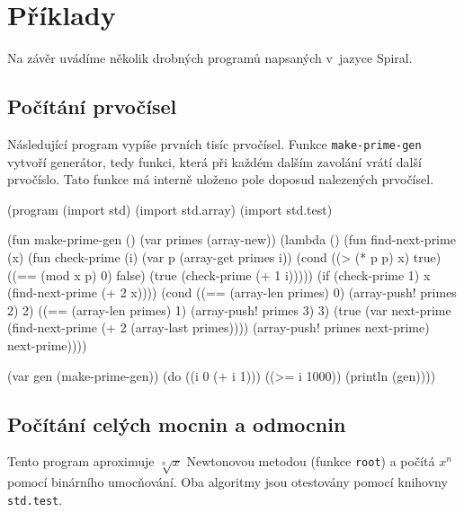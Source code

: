 \section{Příklady}

Na závěr uvádíme několik drobných programů napsaných v~jazyce Spiral.

\subsection{Počítání prvočísel}

Následující program vypíše prvních tisíc prvočísel. Funkce
\texttt{make-prime-gen} vytvoří generátor, tedy funkci, která při každém dalším
zavolání vrátí další prvočíslo. Tato funkce má interně uloženo pole doposud
nalezených prvočísel.

\begin{spiral}
(program
  (import std)
  (import std.array)
  (import std.test)

  (fun make-prime-gen ()
    (var primes (array-new))
    (lambda ()
      (fun find-next-prime (x)
        (fun check-prime (i)
          (var p (array-get primes i))
          (cond
            ((> (* p p) x) true)
            ((== (mod x p) 0) false)
            (true (check-prime (+ 1 i)))))
        (if (check-prime 1) x (find-next-prime (+ 2 x))))
      (cond
        ((== (array-len primes) 0)
          (array-push! primes 2) 2)
        ((== (array-len primes) 1)
          (array-push! primes 3) 3)
        (true 
          (var next-prime (find-next-prime (+ 2 (array-last primes))))
          (array-push! primes next-prime)
          next-prime))))

  (var gen (make-prime-gen))
  (do ((i 0 (+ i 1)))
    ((>= i 1000))
    (println (gen))))
\end{spiral}

\subsection{Počítání celých mocnin a odmocnin}

Tento program aproximuje $\sqrt[n]{x}$ Newtonovou metodou (funkce \texttt{root})
a počítá $x^n$ pomocí binárního umocňování. Oba algoritmy jsou otestovány pomocí
knihovny \texttt{std.test}.

